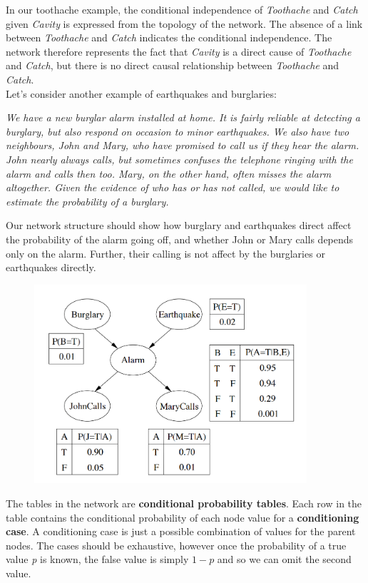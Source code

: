 \documentclass{article}
\newcommand{\n}[0]{\\[\baselineskip]}
\begin{document}
\noindent
In our toothache example, the conditional independence of \textit{Toothache} and \textit{Catch} given \textit{Cavity} is expressed from the topology of the network. The absence of a link between \textit{Toothache} and \textit{Catch} indicates the conditional independence. The network therefore represents the fact that \textit{Cavity} is a direct cause of \textit{Toothache} and \textit{Catch}, but there is no direct causal relationship between \textit{Toothache} and \textit{Catch}.
\n
Let's consider another example of earthquakes and burglaries:
\begin{displayquote}
\textit{We have a new burglar alarm installed at home. It is fairly reliable at detecting a burglary, but also respond on occasion to minor earthquakes. We also have two neighbours, John and Mary, who have promised to call us if they hear the alarm. John nearly always calls, but sometimes confuses the telephone ringing with the alarm and calls then too. Mary, on the other hand, often misses the alarm altogether. Given the evidence of who has or has not called, we would like to estimate the probability of a burglary.}
\end{displayquote}
\noindent
Our network structure should show how burglary and earthquakes direct affect the probability of the alarm going off, and whether John or Mary calls depends only on the alarm. Further, their calling is not affect by the burglaries or earthquakes directly. 
\begin{figure}[H]
\centering
\includegraphics[width=0.9\textwidth, keepaspectratio]{imgs/burglar-bayes-network.png}
\end{figure}
\noindent
The tables in the network are \textbf{conditional probability tables}. Each row in the table contains the conditional probability of each node value for a \textbf{conditioning case}. A conditioning case is just a possible combination of values for the parent nodes. The cases should be exhaustive, however once the probability of a true value \textit{p} is known, the false value is simply $1 - p$ and so we can omit the second value. 
\end{document}
